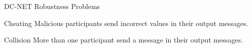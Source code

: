 \begin{frame}{DC-NET Robustness Problems}
    
    \begin{exampleblock}{Cheating}
        Malicious participants send incorrect values in their output messages.
    \end{exampleblock}
    
    \begin{alertblock}{Collision}
        More than one participant send a message in their output messages.
    \end{alertblock}
    
\end{frame}